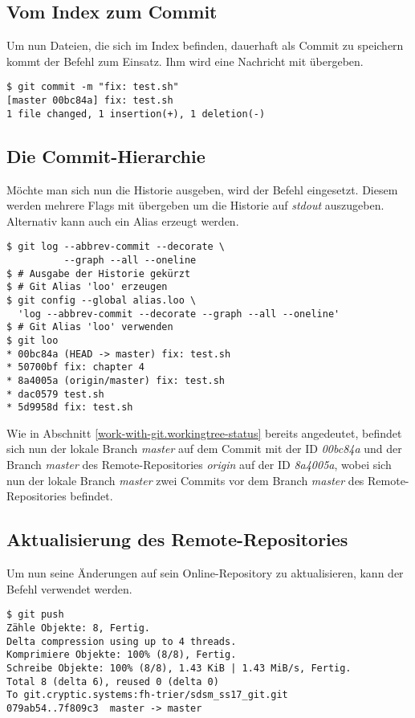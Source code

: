 \subsection{Vom Index zum Commit}
\label{work-with-git.index-to-commit}
Um nun Dateien, die sich im Index befinden, dauerhaft als Commit zu speichern kommt der Befehl \textit{} zum Einsatz. Ihm wird eine Nachricht mit übergeben.

\begin{verbatim}
$ git commit -m "fix: test.sh"
[master 00bc84a] fix: test.sh
1 file changed, 1 insertion(+), 1 deletion(-)
\end{verbatim}

\subsection{Die Commit-Hierarchie}
Möchte man sich nun die Historie ausgeben, wird der Befehl  \textit{} eingesetzt. Diesem werden mehrere Flags mit übergeben um die Historie auf \textit{stdout} auszugeben. Alternativ kann auch ein Alias erzeugt werden.

\begin{verbatim}
$ git log --abbrev-commit --decorate \
          --graph --all --oneline
$ # Ausgabe der Historie gekürzt
$ # Git Alias 'loo' erzeugen
$ git config --global alias.loo \ 
  'log --abbrev-commit --decorate --graph --all --oneline'
$ # Git Alias 'loo' verwenden
$ git loo
* 00bc84a (HEAD -> master) fix: test.sh
* 50700bf fix: chapter 4
* 8a4005a (origin/master) fix: test.sh
* dac0579 test.sh
* 5d9958d fix: test.sh
\end{verbatim}

Wie in Abschnitt \ref{work-with-git.workingtree-status} bereits angedeutet, befindet sich nun der lokale Branch \textit{master} auf dem Commit mit der ID \textit{00bc84a} und der Branch \textit{master} des Remote-Repositories \textit{origin} auf der ID \textit{8a4005a}, wobei sich nun der lokale Branch \textit{master} zwei Commits vor dem Branch \textit{master} des Remote-Repositories befindet.

\subsection{Aktualisierung des Remote-Repositories}
\label{work-with-git.update-online-repo}
Um nun seine Änderungen auf sein Online-Repository zu aktualisieren, kann der Befehl \textit{} verwendet werden. 

\begin{verbatim}
$ git push
Zähle Objekte: 8, Fertig.
Delta compression using up to 4 threads.
Komprimiere Objekte: 100% (8/8), Fertig.
Schreibe Objekte: 100% (8/8), 1.43 KiB | 1.43 MiB/s, Fertig.
Total 8 (delta 6), reused 0 (delta 0)
To git.cryptic.systems:fh-trier/sdsm_ss17_git.git
079ab54..7f809c3  master -> master
\end{verbatim}